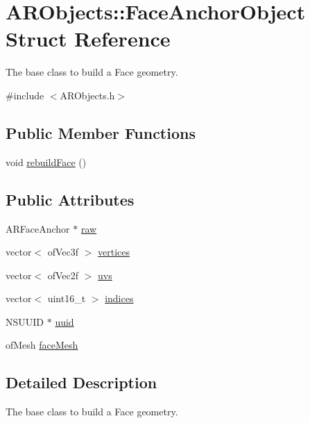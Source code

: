 \hypertarget{struct_a_r_objects_1_1_face_anchor_object}{}\section{A\+R\+Objects\+:\+:Face\+Anchor\+Object Struct Reference}
\label{struct_a_r_objects_1_1_face_anchor_object}


The base class to build a Face geometry.  




{\ttfamily \#include $<$A\+R\+Objects.\+h$>$}

\subsection*{Public Member Functions}
\begin{DoxyCompactItemize}
\item 
void \hyperlink{struct_a_r_objects_1_1_face_anchor_object_a96a5797f99eca7741a909c0ddd871ef2}{rebuild\+Face} ()
\end{DoxyCompactItemize}
\subsection*{Public Attributes}
\begin{DoxyCompactItemize}
\item 
A\+R\+Face\+Anchor $\ast$ \hyperlink{struct_a_r_objects_1_1_face_anchor_object_afe6a909f9e2add9d832b8dc3016aa043}{raw}
\item 
vector$<$ of\+Vec3f $>$ \hyperlink{struct_a_r_objects_1_1_face_anchor_object_a3da1bfaebf1f70c4c725a7046be5bbc9}{vertices}
\item 
vector$<$ of\+Vec2f $>$ \hyperlink{struct_a_r_objects_1_1_face_anchor_object_a35ba743e9a79fb0a46a123a0dfb959ad}{uvs}
\item 
vector$<$ uint16\+\_\+t $>$ \hyperlink{struct_a_r_objects_1_1_face_anchor_object_a97e02fc8b6a44fd1cab3d1b1ebd3fed9}{indices}
\item 
N\+S\+U\+U\+ID $\ast$ \hyperlink{struct_a_r_objects_1_1_face_anchor_object_a8a724eb81c4e6780f54504df24053dbd}{uuid}
\item 
of\+Mesh \hyperlink{struct_a_r_objects_1_1_face_anchor_object_a04e7e9c8c06eedbc5151cd92e939faac}{face\+Mesh}
\end{DoxyCompactItemize}


\subsection{Detailed Description}
The base class to build a Face geometry. 

